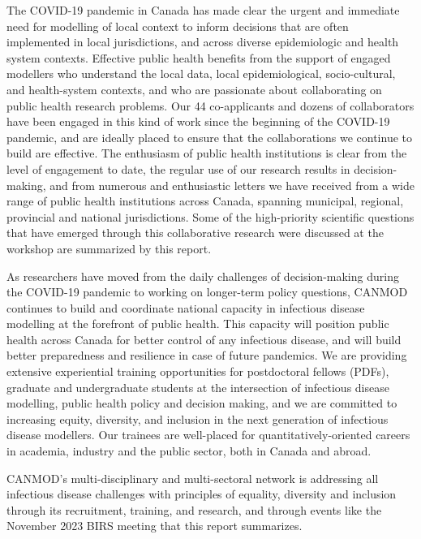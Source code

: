 The
COVID-19 pandemic in Canada has made clear the urgent and immediate
need for modelling of local context to inform decisions that are often
implemented in local jurisdictions, and across diverse epidemiologic
and health system contexts. Effective public health benefits from the
support of engaged modellers who understand the local data, local
epidemiological, socio-cultural, and health-system contexts, and who
are passionate about collaborating on public health research
problems. Our 44 co-applicants and dozens of collaborators have been
engaged in this kind of work since the beginning of the COVID-19
pandemic, and are ideally placed to ensure that the collaborations we
continue to build are effective. The enthusiasm of public health
institutions is clear from the level of engagement to date, the
regular use of our research results in decision-making, and from
numerous and enthusiastic letters we have received from a wide range
of public health institutions across Canada, spanning municipal,
regional, provincial and national jurisdictions. Some of the
high-priority scientific questions that have emerged through this
collaborative research were discussed at the workshop
are summarized by this report.


As researchers have moved from the daily challenges of
decision-making during the COVID-19 pandemic to working on longer-term
policy questions, CANMOD continues to build and coordinate national
capacity in infectious disease modelling at the forefront of public
health. This capacity will position public health across Canada for
better control of any infectious disease, and will build better
preparedness and resilience in case of future pandemics. We are providing extensive experiential training opportunities for
postdoctoral fellows (PDFs), graduate and undergraduate students at
the intersection of infectious disease modelling, public health policy
and decision making, and we are committed to increasing equity,
diversity, and inclusion in the next generation of infectious disease
modellers. Our trainees are well-placed for quantitatively-oriented
careers in academia, industry and the public sector, both in Canada
and abroad.


CANMOD’s multi-disciplinary and multi-sectoral network is addressing
all infectious disease challenges with principles of equality,
diversity and inclusion through its recruitment, training, and
research, and through events like the November 2023 BIRS meeting that
this report summarizes.
